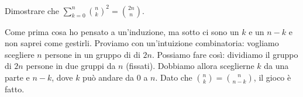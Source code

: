 \begin{prob}
  Dimostrare che $\displaystyle \sum_{k=0}^n \binom{n}{k}^2=\binom{2n}{n}$.
\end{prob}

\begin{sol}
  Come prima cosa ho pensato a un'induzione, ma sotto ci sono un $k$ e un $n-k$ e non saprei come gestirli. Proviamo con un'intuizione combinatoria: vogliamo scegliere $n$ persone in un gruppo di di $2n$. Possiamo fare così: dividiamo il gruppo di $2n$ persone in due gruppi da $n$ (fissati). Dobbiamo allora sceglierne $k$ da una parte e $n-k$, dove $k$ può andare da $0$ a $n$. Dato che $\displaystyle \binom{n}{k}=\binom{n}{n-k}$, il gioco è fatto.
\end{sol}
